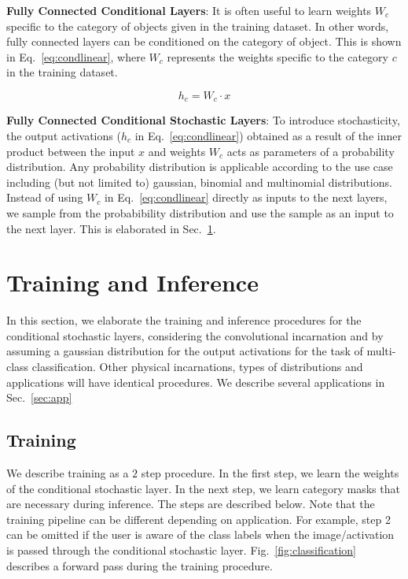 \documentclass[12pt, letterpaper]{article}
\begin{document}
\noindent \textbf{Fully Connected Conditional Layers}: It is often useful to learn weights $W_c$ specific to the category of objects given in the training dataset. In other words, fully connected layers can be conditioned on the category of object. This is shown in Eq.~\eqref{eq:condlinear}, where $W_c$ represents the weights specific to the category $c$ in the training dataset.

\begin{equation}
h_c=W_c \cdot x
    \label{eq:condlinear}
\end{equation}

\noindent \textbf{Fully Connected Conditional Stochastic Layers}:
To introduce stochasticity, the output activations ($h_c$ in Eq.~\eqref{eq:condlinear}) obtained as a result of the inner product between the input $x$ and weights $W_c$ acts as parameters of a probability distribution. 
Any probability distribution is applicable according to the use case including (but not limited to) gaussian, binomial and multinomial distributions.  
Instead of using $W_{c}$ in Eq.~\eqref{eq:condlinear} directly as inputs to the next layers, we sample from the probabibility distribution and use the sample as an input to the next layer. This is elaborated in Sec.~\ref{sec:training_inf}.

\section{Training and Inference}
\label{sec:training_inf}
 
In this section, we elaborate the training and inference procedures for the conditional stochastic layers, considering the convolutional incarnation and by assuming a gaussian distribution for the output activations for the task of multi-class classification. Other physical incarnations, types of distributions and applications will have identical procedures. We describe several applications in Sec.~\ref{sec:app}


\subsection{Training} 
We describe training as a $2$ step procedure. In the first step, we learn the weights of the conditional stochastic layer. In the next step, we learn category masks that are necessary during inference. The steps are described below. Note that the training pipeline can be different depending on application. For example, step 2 can be omitted if the user is aware of the class labels when the image/activation is passed through the conditional stochastic layer. Fig.~\ref{fig:classification} describes a forward pass during the training procedure.
\end{document}

